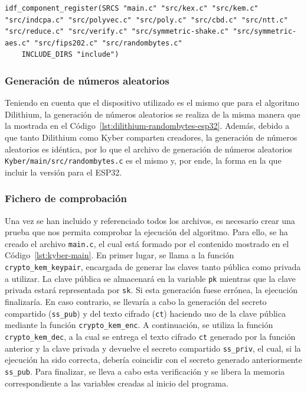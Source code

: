 \begin{lstlisting}[label={lst:kyber-main-cmake},style=Bashnice,firstnumber=1,caption={Archivo \texttt{Kyber/main/CMakeLists.txt}.}]
idf_component_register(SRCS "main.c" "src/kex.c" "src/kem.c" "src/indcpa.c" "src/polyvec.c" "src/poly.c" "src/cbd.c" "src/ntt.c" "src/reduce.c" "src/verify.c" "src/symmetric-shake.c" "src/symmetric-aes.c" "src/fips202.c" "src/randombytes.c"
    INCLUDE_DIRS "include")
\end{lstlisting}

\subsubsection{Generación de números aleatorios}\label{subsubsec:kyber-random}

Teniendo en cuenta que el dispositivo utilizado es el mismo que para el algoritmo Dilithium, la generación de números aleatorios se realiza de la misma manera que la mostrada en el Código~\ref{lst:dilithium-randombytes-esp32}.
Además, debido a que tanto Dilithium como Kyber comparten creadores, la generación de números aleatorios es idéntica, por lo que el archivo de generación de números aleatorios \texttt{Kyber/main/src/randombytes.c} es el mismo y, por ende, la forma en la que incluir la versión para el ESP32.

\subsubsection{Fichero de comprobación}\label{subsubsec:kyber-main}

Una vez se han incluido y referenciado todos los archivos, es necesario crear una prueba que nos permita comprobar la ejecución del algoritmo.
Para ello, se ha creado el archivo \texttt{main.c}, el cual está formado por el contenido mostrado en el Código~\ref{lst:kyber-main}.
En primer lugar, se llama a la función \texttt{crypto\_kem\_keypair}, encargada de generar las claves tanto pública como privada a utilizar.
La clave pública se almacenará en la variable \texttt{pk} mientras que la clave privada estará representada por \texttt{sk}.
Si esta generación fuese errónea, la ejecución finalizaría.
En caso contrario, se llevaría a cabo la generación del secreto compartido (\texttt{ss\_pub}) y del texto cifrado (\texttt{ct}) haciendo uso de la clave pública mediante la función \texttt{crypto\_kem\_enc}.
A continuación, se utiliza la función \texttt{crypto\_kem\_dec}, a la cual se entrega el texto cifrado \texttt{ct} generado por la función anterior y la clave privada y devuelve el secreto compartido \texttt{ss\_priv}, el cual, si la ejecución ha sido correcta, debería coincidir con el secreto generado anteriormente \texttt{ss\_pub}.
Para finalizar, se lleva a cabo esta verificación y se libera la memoria correspondiente a las variables creadas al inicio del programa.

